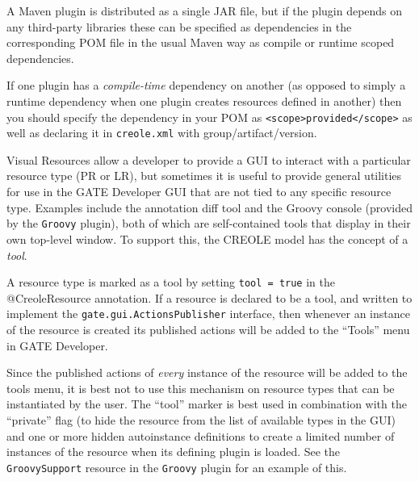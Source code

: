 A Maven plugin is distributed as a single JAR file, but if the plugin depends
on any third-party libraries these can be specified as dependencies in the
corresponding POM file in the usual Maven way as compile or runtime scoped
dependencies.

If one plugin has a \emph{compile-time} dependency on another (as opposed to
simply a runtime dependency when one plugin creates resources defined in
another) then you should specify the dependency in your POM as
\verb|<scope>provided</scope>| as well as declaring it in {\tt creole.xml} with
group/artifact/version.


Visual Resources allow a developer to provide a GUI to interact with a
particular resource type (PR or LR), but sometimes it is useful to provide
general utilities for use in the GATE Developer GUI that are not tied to any
specific resource type.  Examples include the annotation diff tool and the
Groovy console (provided by the \verb|Groovy| plugin), both of which are
self-contained tools that display in their own top-level window.  To support
this, the CREOLE model has the concept of a {\em tool}.

A resource type is marked as a tool by setting \verb|tool = true| in the
@CreoleResource annotation.  If a resource is declared to
be a tool, and written to implement the \verb|gate.gui.ActionsPublisher|
interface, then whenever an instance of the resource is created its published
actions will be added to the ``Tools'' menu in GATE Developer.

Since the published actions of {\em every} instance of the resource will be
added to the tools menu, it is best not to use this mechanism on resource types
that can be instantiated by the user.  The ``tool'' marker is best used in
combination with the ``private'' flag (to hide the resource from the list of
available types in the GUI) and one or more hidden autoinstance definitions
to create a limited number of instances of the resource when its defining
plugin is loaded.  See the \verb|GroovySupport| resource in the \verb|Groovy|
plugin for an example of this.


